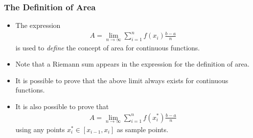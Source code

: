 \documentclass[serif,ignorenonframetext]{beamer}
\begin{document}
\begin{frame}
\begin{columns}
  \end{columns}
\end{frame}

\begin{frame}
  \frametitle{The Definition of Area}
  \begin{itemize}[<+->]
  \item The expression
    \begin{align*}
      A = \lim_{n\to\infty} \sum_{i=1}^{n} f(x_{i}) \frac{b-a}{n}
    \end{align*}
    is used to \textit{define} the concept of area
    for continuous functions.
  \item Note that a Riemann sum appears in the expression for the
    definition of area.
  \item It is possible to prove that the above limit always exists for
    continuous functions.
  \item It is also possible to prove that
    \begin{align*}
      A = \lim_{n\to\infty} \sum_{i=1}^{n} f(x_{i}^*) \frac{b-a}{n}
    \end{align*}
    using any points $x_i^*\in[x_{i-1},x_i]$ as sample points.
  \end{itemize}
\end{frame}
\end{document}
